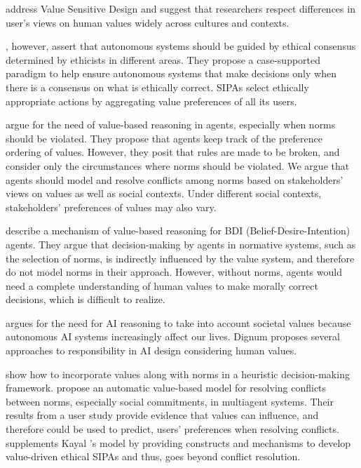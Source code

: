 \citet{Borning-CHI2012-VSD} address Value Sensitive Design and suggest that researchers respect differences in user's views on human values widely across cultures and contexts. 

\citet{anderson-2015-ethical}, however, assert that autonomous systems should be guided by ethical consensus determined by ethicists in different areas. They propose a case-supported paradigm to help ensure autonomous systems that make decisions only when there is a consensus on what is ethically correct. \frameworkAinur SIPAs select ethically appropriate actions by aggregating value preferences of all its users.

\citet{Bench-Capon-ail2017} argue for the need of value-based reasoning in agents, especially when norms should be violated. They propose that agents keep track of the preference ordering of values. However, they posit that rules are made to be broken, and consider only the circumstances where norms should be violated. We argue that agents should model and resolve conflicts among norms based on stakeholders' views on values as well as social contexts. Under different social contexts, stakeholders' preferences of values may also vary. 

\citet{Cranefield-ijcai17-value+bdi} describe a mechanism of value-based reasoning for BDI (Belief-Desire-Intention) agents. They argue that decision-making by agents in normative systems, such as the selection of norms, is indirectly influenced by the value system, and therefore do not model norms in their approach. 
However, without norms, agents would need a complete understanding of human values to make morally correct decisions, which is difficult to realize. 

\citet{dignum-ijcai17-responsible} argues for the need for AI reasoning to take into account societal values because autonomous AI systems increasingly affect our lives. Dignum proposes several approaches to responsibility in AI design considering human values. 

\citet{Serramia+18:values} show how to incorporate values along with norms in a heuristic decision-making framework.
\citet{Kayal-TOIT18} propose an automatic value-based model for resolving conflicts between norms, especially social commitments, in multiagent systems. Their results from a user study provide evidence that values can influence, and therefore could be used to predict, users' preferences when resolving conflicts. \frameworkAinur supplements Kayal {\etal}'s model by providing constructs and mechanisms to develop value-driven ethical SIPAs and thus, goes beyond conflict resolution. 


